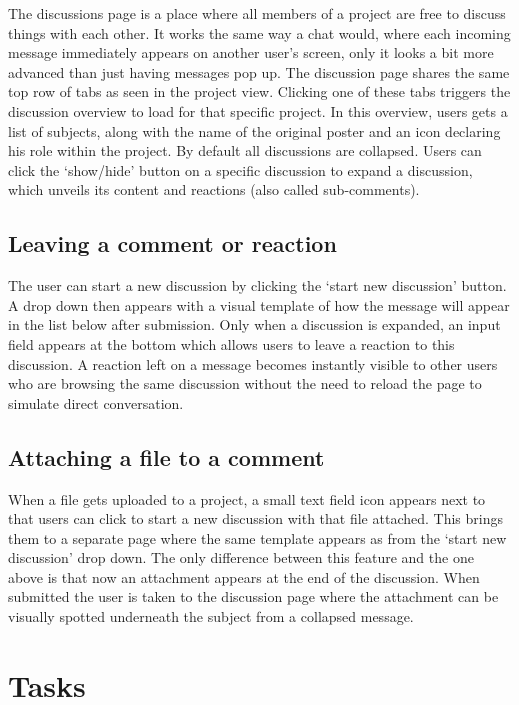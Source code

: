 The discussions page is a place where all members of a project are free to discuss things with each other. It works the same way a chat would, where
each incoming message immediately appears on another user's screen, only it looks a bit more advanced than just having messages pop up.
The discussion page shares the same top row of tabs as seen in the project view. Clicking one of these tabs
triggers the discussion overview to load for that specific project. In this overview, users gets a
list of subjects, along with the name of the original poster and an icon declaring his role within the project. 
By default all discussions are collapsed. Users can click the `show/hide' button on a specific discussion to 
expand a discussion, which unveils its content and reactions (also called sub-comments).

\subsection{Leaving a comment or reaction}

The user can start a new discussion by clicking the `start new discussion' button. A drop down then appears with a visual template of how the message will appear in the list below after submission.  
Only when a discussion is expanded, an input field appears at the bottom which allows users to leave a reaction to this discussion. 
A reaction left on a message becomes instantly visible to other users who are browsing the same discussion without the need to reload the page to simulate direct conversation.

\subsection{Attaching a file to a comment}

When a file gets uploaded to a project, a small text field icon appears next to that users can click to start
a new discussion with that file attached. This brings them to a separate page where the same template appears
as from the `start new discussion' drop down. The only difference between this feature and the one above is that now an attachment appears at the end of the discussion. 
When submitted the user is taken to the discussion page where the attachment can be visually spotted underneath the subject from a collapsed message.

\section{Tasks}

